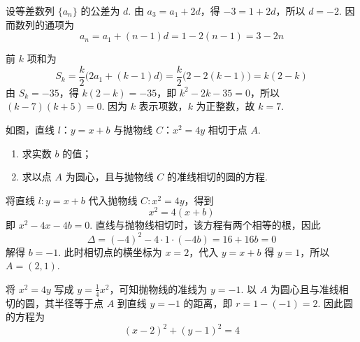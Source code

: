 \begin{solution}
设等差数列 \(\{a_n\}\) 的公差为 \(d\). 由 \(a_3=a_1+2d\)，得 \(-3=1+2d\)，所以 \(d=-2\). 因而数列的通项为
\[
a_n=a_1+(n-1)d=1-2(n-1)=3-2n
\]

前 \(k\) 项和为
\[
S_k=\frac{k}{2}\bigl(2a_1+(k-1)d\bigr)=\frac{k}{2}\bigl(2-2(k-1)\bigr)=k(2-k)
\]
由 \(S_k=-35\)，得 \(k(2-k)=-35\)，即 \(k^2-2k-35=0\)，所以 \((k-7)(k+5)=0\). 因为 \(k\) 表示项数，\(k\) 为正整数，故 \(k=7\).
\end{solution}

\begin{problem}
如图，直线 \(l\)：\(y = x + b\) 与抛物线 \(C\)：\(x^2 = 4y\) 相切于点 \(A\).

\begin{enumerate}
\item 求实数 \(b\) 的值；
\item 求以点 \(A\) 为圆心，且与抛物线 \(C\) 的准线相切的圆的方程.
\end{enumerate}

\begin{center}
\end{center}
\end{problem}

\begin{solution}
将直线 \(l:y=x+b\) 代入抛物线 \(C:x^2=4y\)，得到
\[
x^2=4(x+b)
\]
即 \(x^2-4x-4b=0\). 直线与抛物线相切时，该方程有两个相等的根，因此
\[
\Delta=(-4)^2-4\cdot1\cdot(-4b)=16+16b=0
\]
解得 \(b=-1\). 此时相切点的横坐标为 \(x=2\)，代入 \(y=x+b\) 得 \(y=1\)，所以 \(A=(2,1)\).

将 \(x^2=4y\) 写成 \(y=\frac14x^2\)，可知抛物线的准线为 \(y=-1\). 以 \(A\) 为圆心且与准线相切的圆，其半径等于点 \(A\) 到直线 \(y=-1\) 的距离，即 \(r=1-(-1)=2\). 因此圆的方程为
\[
(x-2)^2+(y-1)^2=4
\]
\end{solution}

